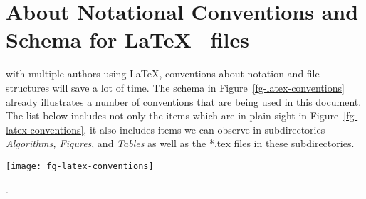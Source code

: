 \documentclass{tufte-book}
\begin{document}
\mainmatter

\section{About Notational Conventions and Schema for \LaTeX~ files}
\label{chap-About-Conventions}

 with multiple authors using \LaTeX,
conventions about notation and file structures
will save a lot of time.
The schema in Figure~\ref{fg-latex-conventions} already illustrates
a number of conventions that are being  used in this document. 
The list below includes not only the items which are in plain sight in Figure~\ref{fg-latex-conventions}, it also includes items we can observe in subdirectories {\em Algorithms, Figures}, and {\em Tables} as well as the *.tex files in these subdirectories.
\begin{marginfigure}[13ex]%
  \texttt{[image: fg-latex-conventions]}
  \caption[Example file fg-latex-conventions.tex]
  {Notational conventions and schema for \LaTeX~files to support collaboration.}
  \label{fg-latex-conventions}
\end{marginfigure}.
\end{document}
